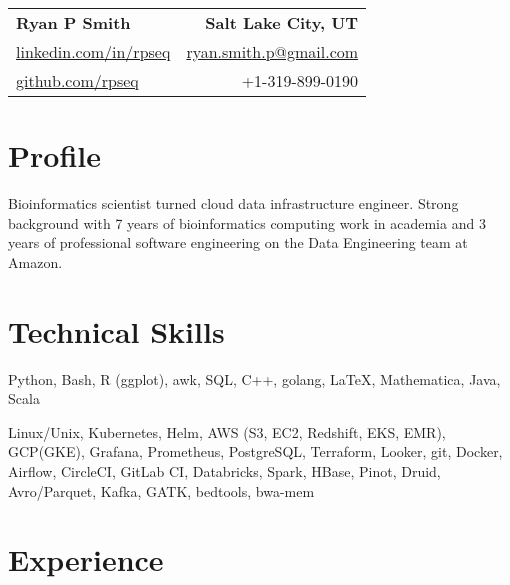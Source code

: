 
\RequirePackage{preamble}



\begin{tabular*}{\textwidth}{l@{\extracolsep{\fill}}r}
	\textbf{{\Large Ryan P Smith}} & \textbf{Salt Lake City, UT} \\
	\href{http://www.linkedin.com/in/rpseq}{linkedin.com/in/rpseq} &
	\href{mailto:ryan.smith.p@gmail.com}{ryan.smith.p@gmail.com} \\
	\href{https://github.com/RPSeq}{github.com/rpseq} & +1-319-899-0190 \\
\end{tabular*}

\section{Profile}

\small{Bioinformatics scientist turned cloud data infrastructure engineer. Strong background with 7 years of bioinformatics computing work in academia and 3 years of professional software engineering on the Data Engineering team at Amazon.}


\section{Technical Skills}
\resumeSubHeadingListStart

{Python, Bash, R (ggplot), awk, SQL, C++, golang, \LaTeX, Mathematica, Java, Scala}

{Linux/Unix, Kubernetes, Helm, AWS (S3, EC2, Redshift, EKS, EMR), GCP(GKE), Grafana, Prometheus, PostgreSQL, Terraform, Looker, git, Docker, Airflow, CircleCI, GitLab CI, Databricks, Spark, HBase, Pinot, Druid, Avro/Parquet, Kafka, GATK, bedtools, bwa-mem}

\resumeSubHeadingListEnd

\section{Experience}
\resumeSubHeadingListStart


